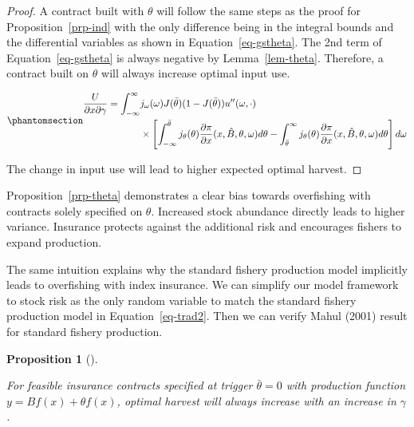 \documentclass[
  letterpaper,
  DIV=11,
  numbers=noendperiod]{scrartcl}
\theoremstyle{plain}
\theoremstyle{plain}
\newtheorem{proposition}{Proposition}[section]
\theoremstyle{remark}
\begin{document}
\begin{proof}
A contract built with \(\theta\) will follow the same steps as the proof
for Proposition~\ref{prp-ind} with the only difference being in the
integral bounds and the differential variables as shown in
Equation~\ref{eq-gstheta}. The 2nd term of Equation~\ref{eq-gstheta} is
always negative by Lemma~\ref{lem-theta}. Therefore, a contract built on
\(\theta\) will always increase optimal input use.

\begin{equation}\phantomsection\label{eq-gstheta}{
\begin{aligned}
\frac{U}{\partial x \partial \gamma}=\int^{\infty}_{-\infty}&j_{\omega}(\omega)J(\bar\theta)(1-J(\bar\theta))u''(\omega,\cdot)\\
&\times\left[ \int^{\bar\theta}_{-\infty}j_{\theta}(\theta)\frac{\partial \pi}{\partial x}(x,\hat{B},\theta,\omega)d\theta
-\int^{\infty}_{\bar{\theta}}j_{\theta}(\theta)\frac{\partial \pi}{\partial x}(x,\hat{B},\theta,\omega)d\theta\right] d\omega
\end{aligned}
}\end{equation}

The change in input use will lead to higher expected optimal harvest.
\end{proof}

Proposition~\ref{prp-theta} demonstrates a clear bias towards
overfishing with contracts solely specified on \(\theta\). Increased
stock abundance directly leads to higher variance. Insurance protects
against the additional risk and encourages fishers to expand production.

The same intuition explains why the standard fishery production model
implicitly leads to overfishing with index insurance. We can simplify
our model framework to stock risk as the only random variable to match
the standard fishery production model in Equation~\ref{eq-trad2}. Then
we can verify Mahul (2001) result for standard fishery production.

\begin{proposition}[]\protect\hypertarget{prp-std}{}\label{prp-std}

For feasible insurance contracts specified at trigger \(\bar\theta=0\)
with production function \(y=Bf(x)+\theta f(x)\), optimal harvest will
always increase with an increase in \(\gamma\).

\end{proposition}
\end{document}
